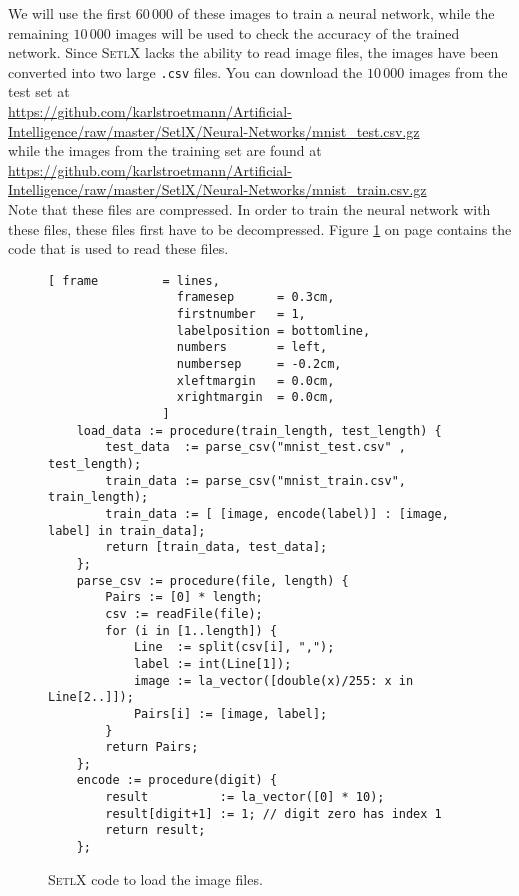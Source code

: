We will use the first $60\,000$ of these images to train a neural network, while the remaining $10\,000$ images
will be used to check the accuracy of the trained network.  Since \textsc{SetlX} lacks the ability to read
image files, the images have been converted into two large \texttt{.csv} files.  You can download the $10\,000$
images from the test set at
\\[0.2cm]
\hspace*{-0.3cm}
\href{https://github.com/karlstroetmann/Artificial-Intelligence/raw/master/SetlX/Neural-Networks/mnist_test.csv.gz}{https://github.com/karlstroetmann/Artificial-Intelligence/raw/master/SetlX/Neural-Networks/mnist\_test.csv.gz}
\\[0.2cm]
while the images from the training set are found at
\\[0.2cm]
\hspace*{-0.3cm}
\href{https://github.com/karlstroetmann/Artificial-Intelligence/raw/master/SetlX/Neural-Networks/mnist_train.csv.gz}{https://github.com/karlstroetmann/Artificial-Intelligence/raw/master/SetlX/Neural-Networks/mnist\_train.csv.gz}
\\[0.2cm]
Note that these files are compressed.  In order to train the neural network with these files, these files first
have to be decompressed.  Figure \ref{fig:nn-loader.stlx} on page \pageref{fig:nn-loader.stlx} contains the
code that is used to read these files.

\begin{figure}[!ht]
\centering
\begin{Verbatim}[ frame         = lines, 
                  framesep      = 0.3cm, 
                  firstnumber   = 1,
                  labelposition = bottomline,
                  numbers       = left,
                  numbersep     = -0.2cm,
                  xleftmargin   = 0.0cm,
                  xrightmargin  = 0.0cm,
                ]
    load_data := procedure(train_length, test_length) {
        test_data  := parse_csv("mnist_test.csv" , test_length);
        train_data := parse_csv("mnist_train.csv", train_length);
        train_data := [ [image, encode(label)] : [image, label] in train_data];
        return [train_data, test_data];
    };
    parse_csv := procedure(file, length) {
        Pairs := [0] * length;
        csv := readFile(file);
        for (i in [1..length]) {
            Line  := split(csv[i], ",");
            label := int(Line[1]);                               
            image := la_vector([double(x)/255: x in Line[2..]]); 
            Pairs[i] := [image, label];
        }
        return Pairs;
    };
    encode := procedure(digit) {  
        result          := la_vector([0] * 10);
        result[digit+1] := 1; // digit zero has index 1
        return result;
    };
\end{Verbatim}
\vspace*{-0.3cm}
\caption{\textsc{SetlX} code to load the image files.}
\label{fig:nn-loader.stlx}
\end{figure}

